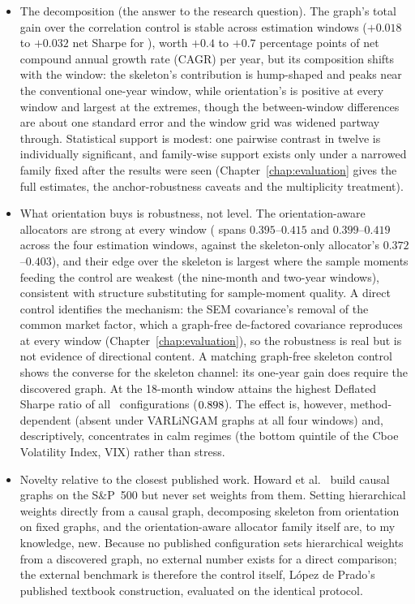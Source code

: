 \begin{itemize}[itemsep=2pt, topsep=3pt]
  \item The decomposition (the answer to the research question).
    The graph's total gain over the correlation control is stable across
    estimation windows ($+0.018$ to $+0.032$ net Sharpe for \skelsem{}), worth
    $+0.4$ to $+0.7$ percentage points of net compound annual growth rate
    (CAGR) per year, but its composition shifts with the window: the
    skeleton's contribution is hump-shaped and peaks near the conventional
    one-year window, while orientation's is positive at every window and
    largest at the extremes, though the between-window differences are
    about one standard error and the window grid was widened partway
    through. Statistical support is modest: one pairwise contrast in
    twelve is individually significant, and family-wise support exists
    only under a narrowed family fixed after the results were seen
    (Chapter~\ref{chap:evaluation} gives the full estimates, the
    anchor-robustness caveats and the multiplicity treatment).
  \item What orientation buys is robustness, not level. The
    orientation-aware allocators are strong at every window (\skelsem{}
    spans $0.395$--$0.415$ and \orientsem{} $0.399$--$0.419$ across the
    four estimation windows, against the skeleton-only allocator's
    $0.372$--$0.403$), and their edge over the skeleton is largest where
    the sample moments feeding the control are weakest (the nine-month and
    two-year windows), consistent with structure substituting for
    sample-moment quality. A direct control identifies the mechanism: the
    SEM covariance's removal of the common market factor, which a
    graph-free de-factored covariance reproduces at every window
    (Chapter~\ref{chap:evaluation}), so the robustness is real but is not
    evidence of directional content. A matching graph-free skeleton
    control shows the converse for the skeleton channel: its one-year
    gain does require the discovered graph. At the 18-month window
    \orientsem{} attains the highest Deflated
    Sharpe ratio of all \rsNtrials\ configurations
    ($0.898$). The effect is, however,
    method-dependent (absent under VARLiNGAM graphs at all four windows)
    and, descriptively, concentrates in calm regimes (the bottom quintile
    of the Cboe Volatility Index, VIX) rather than stress.
  \item Novelty relative to the closest published work. Howard et
    al.\ \cite{howard2025causal} build causal graphs on the S\&P~500 but
    never set weights from them. Setting hierarchical weights
    directly from a causal graph, decomposing skeleton from orientation on
    fixed graphs, and the orientation-aware allocator family itself are, to
    my knowledge, new. Because no published configuration sets hierarchical
    weights from a discovered graph, no external number exists for a direct
    comparison; the external benchmark is therefore the \HRP{} control
    itself, L\'opez de Prado's published textbook construction, evaluated
    on the identical protocol.
\end{itemize}

